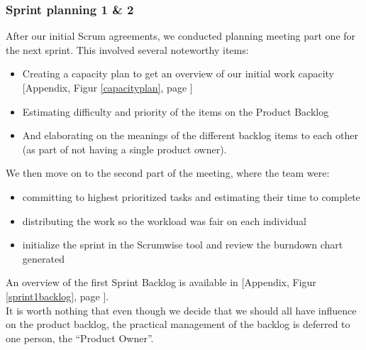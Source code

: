 \subsubsection{Sprint planning 1 \& 2}
After our initial Scrum agreements, we conducted planning meeting part one for the next sprint. This involved several noteworthy items:
\begin{itemize}
\item Creating a capacity plan to get an overview of our initial work capacity [Appendix, Figur \ref{capacityplan}, page \pageref{capacityplan}]
\item Estimating difficulty and priority of the items on the Product Backlog
\item And elaborating on the meanings of the different backlog items to each other (as part of not having a single product owner).
\end{itemize}
We then move on to the second part of the meeting, where the team were:
\begin{itemize}
\item committing to highest prioritized tasks and estimating their time to complete
\item distributing the work so the workload was fair on each individual
\item initialize the sprint in the Scrumwise tool and review the burndown chart generated
\end{itemize}
An overview of the first Sprint Backlog is available in [Appendix, Figur \ref{sprint1backlog}, page \pageref{sprint1backlog}].\\
It is worth nothing that even though we decide that we should all have influence on the product backlog, the practical management of the backlog is deferred to one person, the “Product Owner”.\\



\newpage